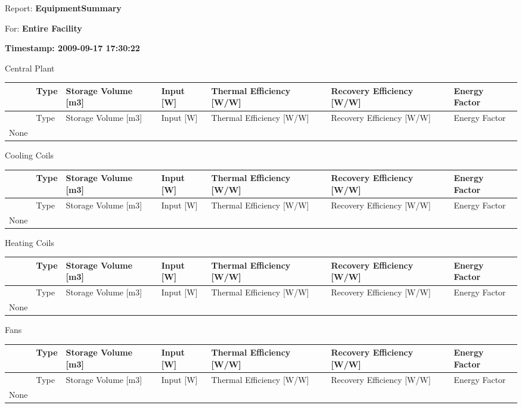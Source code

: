 Report: \textbf{EquipmentSummary}

For: \textbf{Entire Facility}

\textbf{Timestamp: 2009-09-17 17:30:22}

Central Plant

\begin{longtable}[c]{p{0.85in}p{0.85in}p{0.85in}p{0.85in}p{0.85in}p{0.85in}p{0.85in}}
\toprule 
~ & Type & Storage Volume [m3] & Input [W] & Thermal Efficiency [W/W] & Recovery Efficiency [W/W] & Energy Factor \tabularnewline
\midrule
\endfirsthead

\toprule 
~ & Type & Storage Volume [m3] & Input [W] & Thermal Efficiency [W/W] & Recovery Efficiency [W/W] & Energy Factor \tabularnewline
\midrule
\endhead

None & ~ & ~ & ~ & ~ & ~ & ~ \tabularnewline
\bottomrule
\end{longtable}

Cooling Coils

\begin{longtable}[c]{p{0.85in}p{0.85in}p{0.85in}p{0.85in}p{0.85in}p{0.85in}p{0.85in}}
\toprule 
~ & Type & Storage Volume [m3] & Input [W] & Thermal Efficiency [W/W] & Recovery Efficiency [W/W] & Energy Factor \tabularnewline
\midrule
\endfirsthead

\toprule 
~ & Type & Storage Volume [m3] & Input [W] & Thermal Efficiency [W/W] & Recovery Efficiency [W/W] & Energy Factor \tabularnewline
\midrule
\endhead

None & ~ & ~ & ~ & ~ & ~ & ~ \tabularnewline
\bottomrule
\end{longtable}

Heating Coils

\begin{longtable}[c]{p{0.85in}p{0.85in}p{0.85in}p{0.85in}p{0.85in}p{0.85in}p{0.85in}}
\toprule 
~ & Type & Storage Volume [m3] & Input [W] & Thermal Efficiency [W/W] & Recovery Efficiency [W/W] & Energy Factor \tabularnewline
\midrule
\endfirsthead

\toprule 
~ & Type & Storage Volume [m3] & Input [W] & Thermal Efficiency [W/W] & Recovery Efficiency [W/W] & Energy Factor \tabularnewline
\midrule
\endhead

None & ~ & ~ & ~ & ~ & ~ & ~ \tabularnewline
\bottomrule
\end{longtable}

Fans

\begin{longtable}[c]{p{0.85in}p{0.85in}p{0.85in}p{0.85in}p{0.85in}p{0.85in}p{0.85in}}
\toprule 
~ & Type & Storage Volume [m3] & Input [W] & Thermal Efficiency [W/W] & Recovery Efficiency [W/W] & Energy Factor \tabularnewline
\midrule
\endfirsthead

\toprule 
~ & Type & Storage Volume [m3] & Input [W] & Thermal Efficiency [W/W] & Recovery Efficiency [W/W] & Energy Factor \tabularnewline
\midrule
\endhead

None & ~ & ~ & ~ & ~ & ~ & ~ \tabularnewline
\bottomrule
\end{longtable}

